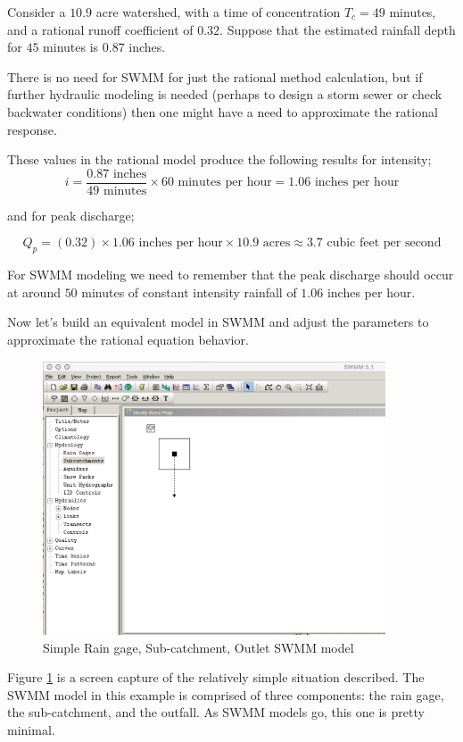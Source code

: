 \documentclass[12pt]{article}
\begin{document}
Consider a $10.9$ acre watershed, with a time of concentration $T_c = 49$ minutes, and a rational runoff coefficient of $0.32$.  
Suppose that the estimated rainfall depth for $45$ minutes is $0.87$ inches.

There is no need for SWMM for just the rational method calculation, but if further hydraulic modeling is needed (perhaps to design a storm sewer or check backwater conditions) then one might have a need to approximate the rational response.

These values in the rational model produce the following results for intensity;
\begin{equation}
i = \frac{0.87\text{ inches}}{49\text{ minutes}} \times 60\text{ minutes per hour} = 1.06 \text{ inches per hour}
\end{equation}

and for peak discharge;

\begin{equation}
Q_p = (0.32) \times 1.06 \text{ inches per hour} \times 10.9 \text{ acres} \approx 3.7 \text{ cubic feet per second}
\end{equation}

For SWMM modeling we need to remember that the peak discharge should occur at around $50$ minutes of constant intensity rainfall of $1.06$ inches per hour.

Now let's build an equivalent model in SWMM and adjust the parameters to approximate the rational equation behavior.

\begin{figure}[h!] %
   \centering
   \includegraphics[width=4in]{SWMM-ModelStudyMap.jpg} 
   \caption{Simple Rain gage, Sub-catchment, Outlet SWMM model}
   \label{fig:SWMM-ModelStudyMap}
\end{figure}
Figure \ref{fig:SWMM-ModelStudyMap} is a screen capture of the relatively simple situation described.   
The SWMM model in this example is comprised of three components: the rain gage, the sub-catchment, and the outfall. 
As SWMM models go, this one is pretty minimal.
\end{document}
